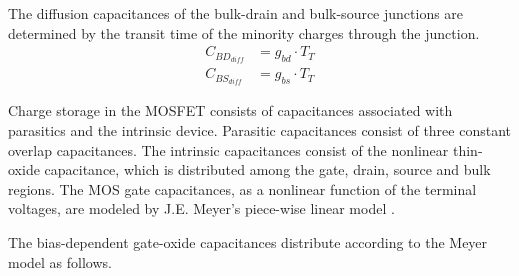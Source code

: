 The diffusion capacitances of the bulk-drain and bulk-source junctions
are determined by the transit time of the minority charges through the
junction.
\begin{align}
C_{BD_{diff}} &= g_{bd}\cdot T_T\\
C_{BS_{diff}} &= g_{bs}\cdot T_T
\end{align}

Charge storage in the MOSFET consists of capacitances associated with
parasitics and the intrinsic device.  Parasitic capacitances consist
of three constant overlap capacitances.  The intrinsic capacitances
consist of the nonlinear thin-oxide capacitance, which is distributed
among the gate, drain, source and bulk regions.  The MOS gate
capacitances, as a nonlinear function of the terminal voltages, are
modeled by J.E. Meyer's piece-wise linear model \cite{Meyer}.

\addvspace{12pt}

The bias-dependent gate-oxide capacitances distribute according to the
Meyer model \cite{Meyer} as follows.

